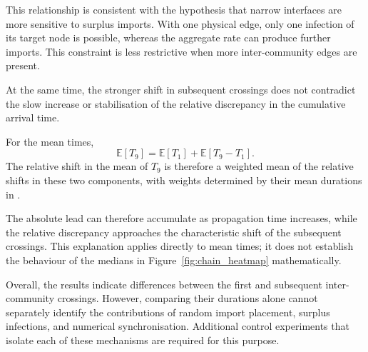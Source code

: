 This relationship is consistent with the hypothesis that narrow interfaces are more sensitive to surplus imports. With one physical edge, only one infection of its target node is possible, whereas the aggregate rate can produce further imports. This constraint is less restrictive when more inter-community edges are present.

At the same time, the stronger shift in subsequent crossings does not contradict the slow increase or stabilisation of the relative discrepancy in the cumulative arrival time.

For the mean times,
\begin{equation}
\mathbb{E}[T_9]
=
\mathbb{E}[T_1]
+
\mathbb{E}[T_9-T_1].
\end{equation}
The relative shift in the mean of $T_9$ is therefore a weighted mean of the relative shifts in these two components, with weights determined by their mean durations in \Full{}.

The absolute lead can therefore accumulate as propagation time increases, while the relative discrepancy approaches the characteristic shift of the subsequent crossings. This explanation applies directly to mean times; it does not establish the behaviour of the medians in Figure~\ref{fig:chain_heatmap} mathematically.

Overall, the results indicate differences between the first and subsequent inter-community crossings. However, comparing their durations alone cannot separately identify the contributions of random import placement, surplus infections, and numerical synchronisation. Additional control experiments that isolate each of these mechanisms are required for this purpose.
